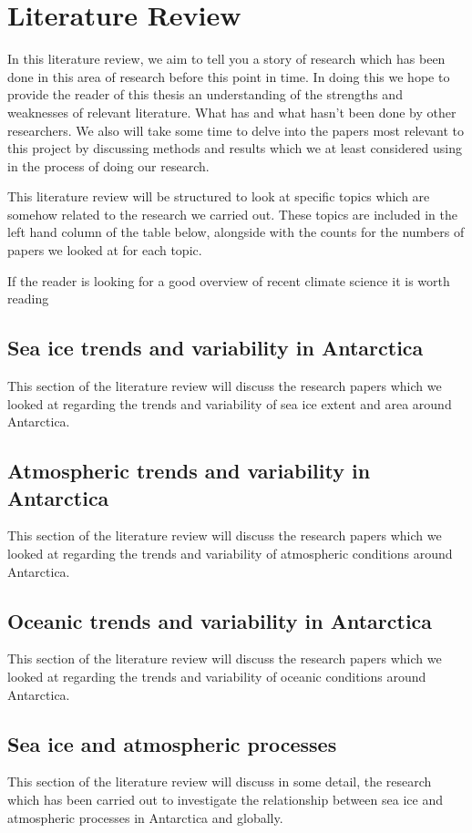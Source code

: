 \documentclass[../main.tex]{subfiles}
\begin{document}
\chapter{Literature Review}
In this literature review, we aim to tell you a story of research which has been done in this area of research before this point in time. In doing this we hope to provide the reader of this thesis an understanding of the strengths and weaknesses of relevant literature. What has and what hasn't been done by other researchers. We also will take some time to delve into the papers most relevant to this project by discussing methods and results which we at least considered using in the process of doing our research.\medskip

This literature review will be structured to look at specific topics which are somehow related to the research we carried out. These topics are included in the left hand column of the table below, alongside with the counts for the numbers of papers we looked at for each topic.

If the reader is looking for a good overview of recent climate science it is worth reading \cite{Clem2015}


\section{Sea ice trends and variability in Antarctica}
This section of the literature review will discuss the research papers which we looked at regarding the trends and variability of sea ice extent and area around Antarctica.


\section{Atmospheric trends and variability in Antarctica}
This section of the literature review will discuss the research papers which we looked at regarding the trends and variability of atmospheric conditions around Antarctica.


\section{Oceanic trends and variability in Antarctica}
This section of the literature review will discuss the research papers which we looked at regarding the trends and variability of oceanic conditions around Antarctica.

\section{Sea ice and atmospheric processes}
This section of the literature review will discuss in some detail, the research which has been carried out to investigate the relationship between sea ice and atmospheric processes in Antarctica and globally.
\end{document}
